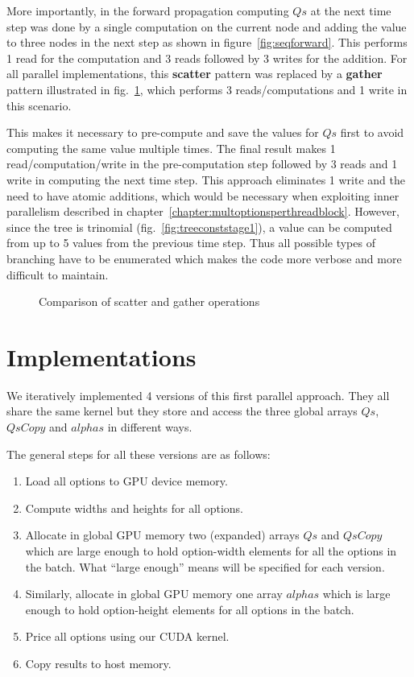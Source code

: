  More importantly, in the forward propagation computing $\mathit{Qs}$ at the next time step was done by a single computation on the current node and adding the value to three nodes in the next step as shown in figure~\ref{fig:seqforward}. This performs 1 read for the computation and 3 reads followed by 3 writes for the addition. For all parallel implementations, this \textbf{scatter} pattern was replaced by a \textbf{gather} pattern illustrated in fig.~\ref{fig:scattervsgather}, which performs 3 reads/computations and 1 write in this scenario.
 
 This makes it necessary to pre-compute and save the values for $\mathit{Qs}$ first to avoid computing the same value multiple times. The final result makes 1 read/computation/write in the pre-computation step followed by 3 reads and 1 write in computing the next time step. This approach eliminates 1 write and the need to have atomic additions, which would be necessary when exploiting inner parallelism described in chapter~\ref{chapter:multoptionsperthreadblock}. However, since the tree is trinomial (fig.~\ref{fig:treeconststage1}), a value can be computed from up to 5 values from the previous time step. Thus all possible types of branching have to be enumerated which makes the code more verbose and more difficult to maintain.

\begin{figure}[H]
    \centering
    \def\svgwidth{0.8\textwidth}
	\caption{Comparison of scatter and gather operations}
    
	\label{fig:scattervsgather}
\end{figure}

\section{Implementations}
We iteratively implemented 4 versions of this first parallel approach. They all share the same kernel but they store and access the three global arrays $\mathit{Qs}$, $\mathit{QsCopy}$ and $\mathit{alphas}$ in different ways.

The general steps for all these versions are as follows:
\begin{enumerate}
    \item Load all options to GPU device memory.
    \item Compute widths and heights for all options.
    \item Allocate in global GPU memory two (expanded) arrays $\mathit{Qs}$ and $\mathit{QsCopy}$ which are large enough to hold option-width elements for all the options in the batch. What \enquote{large enough} means will be specified for each version.
    \item Similarly, allocate in global GPU memory one array $\mathit{alphas}$ which is large enough to hold option-height elements for all options in the batch.
    \item Price all options using our CUDA kernel.
    \item Copy results to host memory.
\end{enumerate}

